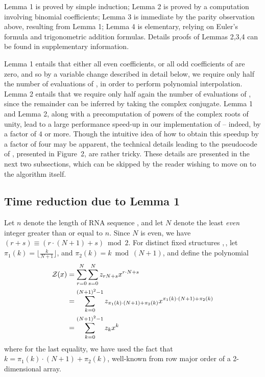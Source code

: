Lemma 1 is proved by simple induction; Lemma 2
is proved by a computation involving binomial coefficients;
Lemma 3 is immediate
by the parity observation above, resulting from Lemma 1;
Lemma 4 is elementary, relying on Euler's
formula and trigonometric addition formulas. Details proofs of
Lemmas 2,3,4 can be found in supplementary information.

Lemma 1 entails that either all even coefficients, or all odd coefficients
of \emZ{} are zero, and so by a variable change described in detail below,
we require only half the number of evaluations of \emZ{}, in order to perform
polynomial interpolation.
Lemma 2 entails that we require only half again the number of evaluations of
\emZ{}, since the remainder can be inferred by taking the complex conjugate.
Lemma 1 and Lemma 2, along with a
precomputation of powers of the complex roots of unity, lead to a
large performance speed-up in our implementation of \ffttwo -- indeed,
by a factor of $4$ or more. Though the intuitive idea of how to obtain
this speedup by a factor of four may be apparent, the technical details
leading to the pseudocode of \ffttwo, presented in
Figure~2, are rather tricky. These details
are presented in the next two subsections, which can be skipped by the
reader wishing to move on to the algorithm itself.
\medskip

\subsection{Time reduction due to Lemma 1}
Let $n$ denote the length of RNA sequence \seq, and let $N$ denote the
least {\em even} integer greater than or equal to $n$. Since $N$ is even,
we have $(r+s) \equiv (r\cdot(N+1)+s) \bmod 2$. For distinct
fixed structures \strA,\,\strB, let
$\pi_1(k) = \lfloor \frac{k}{N+1} \rfloor$, and
$\pi_2(k) = k \bmod (N+1)$, and define the polynomial
\begin{align}
\label{eq:polynomialPeter}
\emZ{} &= \sum_{r=0}^{N} \sum_{s=0}^{N} z_{rN+s} x^{r\cdot N + s}\\
&=
\sum_{k=0}^{(N+1)^2-1} z_{\pi_1(k)\cdot (N+1) + \pi_2(k)}
x^{\pi_1(k)\cdot (N+1) + \pi_2(k)}\\
&=
\sum_{k=0}^{(N+1)^2-1} z_k x^k
\end{align}
where for the last equality, we have used the fact that
$k = \pi_1(k)\cdot (N+1) + \pi_2(k)$, well-known from
row major order of a 2-dimensional array.


